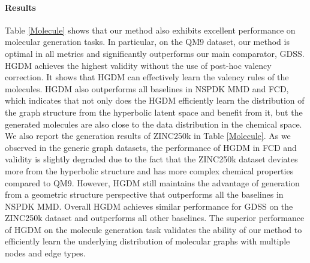 \documentclass[letterpaper]{article} %
\begin{document}
\paragraph{Results}
Table \ref{Molecule} shows that our method also exhibits excellent performance on molecular generation tasks. In particular, on the QM9 dataset, our method is optimal in all metrics and significantly outperforms our main comparator, GDSS. HGDM achieves the highest validity without the use of post-hoc valency correction. It shows that HGDM can effectively learn the valency rules of the molecules. HGDM also outperforms all baselines in NSPDK MMD and FCD, which indicates that not only does the HGDM efficiently learn the distribution of the graph structure from the hyperbolic latent space and benefit from it, but the generated molecules are also close to the data distribution in the chemical space.
We also report the generation results of ZINC250k in Table \ref{Molecule}. As we observed in the generic graph datasets, the performance of HGDM in FCD and validity is slightly degraded due to the fact that the ZINC250k dataset deviates more from the hyperbolic structure and has more complex chemical properties compared to QM9. However, HGDM still maintains the advantage of generation from a geometric structure perspective that outperforms all the baselines in NSPDK MMD. Overall HGDM achieves similar performance for GDSS on the ZINC250k dataset and outperforms all other baselines. The superior performance of HGDM on the molecule generation task validates the ability of our method to efficiently learn the underlying distribution of molecular graphs with multiple nodes and edge types.
\end{document}
